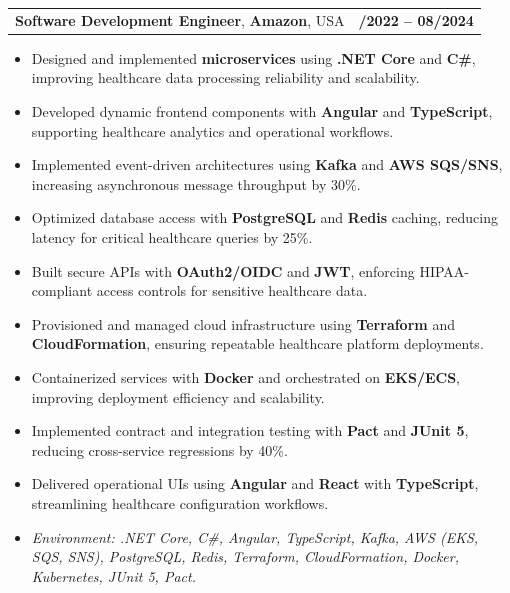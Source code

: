 \documentclass[letterpaper,11pt]{article}
\makeatletter
\newcommand{\resumeItem}[1]{
  \item\footnotesize{
    {#1 \vspace{-2pt}}
  }
}
\newcommand{\resumeSubheading}[4]{
  \vspace{-2pt}\item
    \begin{tabular*}{1.0\textwidth}[t]{l@{\extracolsep{\fill}}r}
      \textbf{\fontsize{10pt}{14pt}\selectfont #3}, \textbf{\fontsize{10pt}{14pt}\selectfont #1}, \fontsize{10pt}{14pt}\selectfont #4 & \textbf{\fontsize{10pt}{14pt}\selectfont #2} \\
    \end{tabular*}\vspace{-7pt}
}
\newcommand{\resumeItemListStart}{\begin{itemize}[leftmargin=*]}
\newcommand{\resumeItemListEnd}{\end{itemize}\vspace{-5pt}}
\makeatother
\begin{document}
\resumeSubheading
{Amazon}{10/2022 -- 08/2024}
{Software Development Engineer}{USA}
\resumeItemListStart
  \resumeItem{Designed and implemented \textbf{microservices} using \textbf{.NET Core} and \textbf{C\#}, improving healthcare data processing reliability and scalability.}
  \resumeItem{Developed dynamic frontend components with \textbf{Angular} and \textbf{TypeScript}, supporting healthcare analytics and operational workflows.}
  \resumeItem{Implemented event-driven architectures using \textbf{Kafka} and \textbf{AWS SQS/SNS}, increasing asynchronous message throughput by 30\%.}
  \resumeItem{Optimized database access with \textbf{PostgreSQL} and \textbf{Redis} caching, reducing latency for critical healthcare queries by 25\%.}
  \resumeItem{Built secure APIs with \textbf{OAuth2/OIDC} and \textbf{JWT}, enforcing HIPAA-compliant access controls for sensitive healthcare data.}
  \resumeItem{Provisioned and managed cloud infrastructure using \textbf{Terraform} and \textbf{CloudFormation}, ensuring repeatable healthcare platform deployments.}
  \resumeItem{Containerized services with \textbf{Docker} and orchestrated on \textbf{EKS/ECS}, improving deployment efficiency and scalability.}
  \resumeItem{Implemented contract and integration testing with \textbf{Pact} and \textbf{JUnit 5}, reducing cross-service regressions by 40\%.}
  \resumeItem{Delivered operational UIs using \textbf{Angular} and \textbf{React} with \textbf{TypeScript}, streamlining healthcare configuration workflows.}
  \resumeItem{\textit{Environment: .NET Core, C\#, Angular, TypeScript, Kafka, AWS (EKS, SQS, SNS), PostgreSQL, Redis, Terraform, CloudFormation, Docker, Kubernetes, JUnit 5, Pact.}}
\resumeItemListEnd
\end{document}
